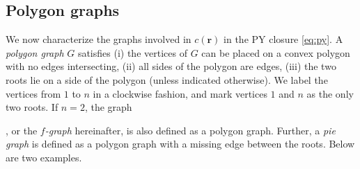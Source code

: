 \documentclass[aip,jcp,reprint,superscriptaddress]{revtex4-1}
\newcommand{\vct}[1]{\mathbf{#1}}
\providecommand{\vr}{} %
\renewcommand{\vr}{\vct{r}}
\begin{document}
\subsection{Polygon graphs}



We now characterize the graphs involved in $c(\vr)$
  in the PY closure \eqref{eq:py}.
%
A \emph{polygon graph} $G$ satisfies
  (i) the vertices of $G$ can be placed
  on a convex polygon
  with no edges intersecting,
  (ii) all sides of the polygon are edges,
  (iii) the two roots lie on a side of the polygon (unless indicated otherwise).
%
We label the vertices from $1$ to $n$ in a clockwise fashion,
  and mark vertices $1$ and $n$ as the only two roots.
%
If $n = 2$, the graph
  ,
  or the \emph{$f$-graph} hereinafter,
  is also defined as a polygon graph.
%
Further,
  a \emph{pie graph}
  is defined as
  a polygon graph with a missing edge between the roots.
%
Below are two examples.
%
\end{document}
